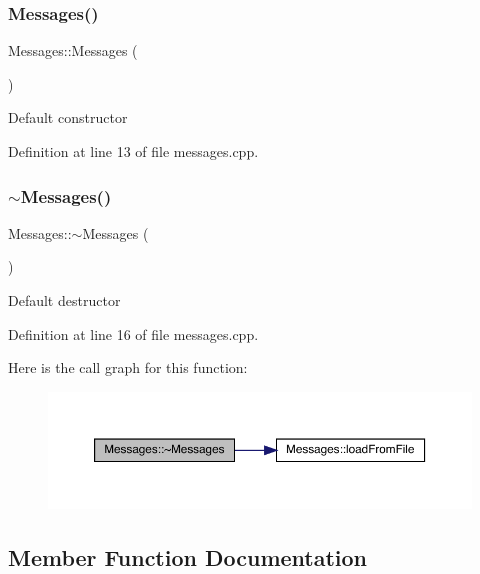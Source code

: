 \subsubsection{\texorpdfstring{Messages()}{Messages()}}
{\footnotesize\ttfamily Messages\+::\+Messages (\begin{DoxyParamCaption}{ }\end{DoxyParamCaption})}

Default constructor 

Definition at line 13 of file messages.\+cpp.

\mbox{\label{class_messages_ab0060ed5667e5dd2d47811df6c42d462}} 
\subsubsection{\texorpdfstring{$\sim$\+Messages()}{~Messages()}}
{\footnotesize\ttfamily Messages\+::$\sim$\+Messages (\begin{DoxyParamCaption}{ }\end{DoxyParamCaption})\hspace{0.3cm}{\ttfamily [virtual]}}

Default destructor 

Definition at line 16 of file messages.\+cpp.

Here is the call graph for this function\+:\nopagebreak
\begin{figure}[H]
\begin{center}
\leavevmode
\includegraphics[width=350pt]{class_messages_ab0060ed5667e5dd2d47811df6c42d462_cgraph}
\end{center}
\end{figure}


\subsection{Member Function Documentation}
\mbox{\label{class_messages_ac575287a8c19833d30480c5fb1769dfa}} 
